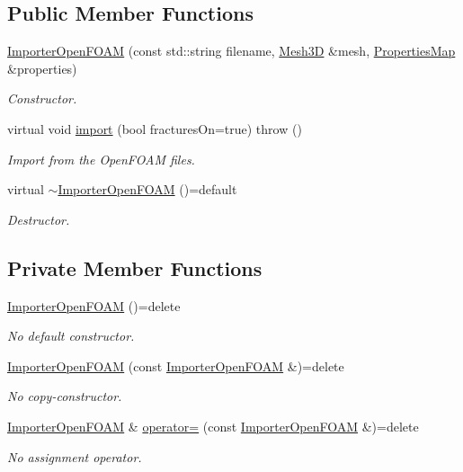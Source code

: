 \subsection*{Public Member Functions}
\begin{DoxyCompactItemize}
\item 
\hyperlink{classFVCode3D_1_1ImporterOpenFOAM_a679c1d057723a5e11c53ec52a2de36b5}{Importer\+Open\+F\+O\+AM} (const std\+::string filename, \hyperlink{classFVCode3D_1_1Mesh3D}{Mesh3D} \&mesh, \hyperlink{classFVCode3D_1_1PropertiesMap}{Properties\+Map} \&properties)
\begin{DoxyCompactList}\small\item\em Constructor. \end{DoxyCompactList}\item 
virtual void \hyperlink{classFVCode3D_1_1ImporterOpenFOAM_ac8d43d9c6d007f5637e5878cef77df5e}{import} (bool fractures\+On=true)  throw ()
\begin{DoxyCompactList}\small\item\em Import from the Open\+F\+O\+AM files. \end{DoxyCompactList}\item 
virtual \hyperlink{classFVCode3D_1_1ImporterOpenFOAM_a610b6318d309109c9a848316c99148fc}{$\sim$\+Importer\+Open\+F\+O\+AM} ()=default
\begin{DoxyCompactList}\small\item\em Destructor. \end{DoxyCompactList}\end{DoxyCompactItemize}
\subsection*{Private Member Functions}
\begin{DoxyCompactItemize}
\item 
\hyperlink{classFVCode3D_1_1ImporterOpenFOAM_a5e42e3b615f7defa0db073545face0ba}{Importer\+Open\+F\+O\+AM} ()=delete
\begin{DoxyCompactList}\small\item\em No default constructor. \end{DoxyCompactList}\item 
\hyperlink{classFVCode3D_1_1ImporterOpenFOAM_ada1669c2e0bbaa90bcad74fd4e7dd64e}{Importer\+Open\+F\+O\+AM} (const \hyperlink{classFVCode3D_1_1ImporterOpenFOAM}{Importer\+Open\+F\+O\+AM} \&)=delete
\begin{DoxyCompactList}\small\item\em No copy-\/constructor. \end{DoxyCompactList}\item 
\hyperlink{classFVCode3D_1_1ImporterOpenFOAM}{Importer\+Open\+F\+O\+AM} \& \hyperlink{classFVCode3D_1_1ImporterOpenFOAM_a2f0792dfcb70bc6e1f5ee540b5c635b1}{operator=} (const \hyperlink{classFVCode3D_1_1ImporterOpenFOAM}{Importer\+Open\+F\+O\+AM} \&)=delete
\begin{DoxyCompactList}\small\item\em No assignment operator. \end{DoxyCompactList}\end{DoxyCompactItemize}
